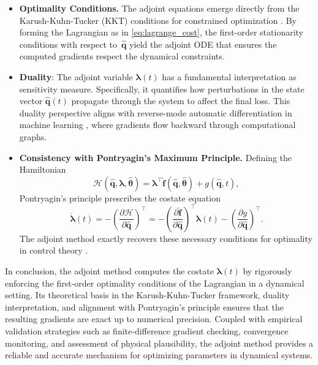 \begin{itemize}
    \item \textbf{Optimality Conditions.}  The adjoint equations emerge directly from the Karush-Kuhn-Tucker (KKT) conditions for constrained optimization \cite{nocedal1999numerical}. By forming the Lagrangian as in \eqref{eq:lagrange_cost},
  the first-order stationarity conditions with respect to~$\hat{\mathbf{q}}$ yield the adjoint ODE that ensures the computed gradients respect the dynamical constraints.
    
    \item \textbf{Duality}: The adjoint variable $\bm{\lambda}(t)$ has a fundamental interpretation as sensitivity measure. Specifically, it quantifies how perturbations in the state vector $\hat{\mathbf{q}}(t)$ propagate through the system to affect the final loss. This duality perspective aligns with reverse-mode automatic differentiation in machine learning \cite{chen2018neural}, where gradients flow backward through computational graphs.

    \item \textbf{Consistency with Pontryagin's Maximum Principle.}  Defining the Hamiltonian\\
  $$\mathcal{H}(\hat{\mathbf{q}}, \bm{\lambda}, \hat{\bm{\theta}}) 
      = \bm{\lambda}^\top \hat{\mathbf{f}}(\hat{\mathbf{q}}, \hat{\bm{\theta}}) 
      + g(\hat{\mathbf{q}}, t),$$
  Pontryagin's principle prescribes the costate equation\\
  $$\dot{\bm{\lambda}}(t) 
      = - \left(\frac{\partial \mathcal{H}}{\partial \hat{\mathbf{q}}} \right)^{\top}
      = - \left(\frac{\partial \hat{\mathbf{f}}}{\partial \hat{\mathbf{q}}} \right)^{\top}\bm{\lambda}(t) -  \left(\frac{\partial g}{\partial \hat{\mathbf{q}}} \right)^{\top}.$$
  The adjoint method exactly recovers these necessary conditions for optimality in control theory \cite{liberzon2011calculus}.
\end{itemize}

In conclusion, the adjoint method computes the costate $\bm{\lambda}(t)$ by rigorously enforcing the first-order optimality conditions of the Lagrangian in a dynamical setting. Its theoretical basis in the Karush-Kuhn-Tucker framework, duality interpretation, and alignment with Pontryagin's principle ensures that the resulting gradients are exact up to numerical precision. Coupled with empirical validation strategies such as finite-difference gradient checking, convergence monitoring, and assessment of physical plausibility, the adjoint method provides a reliable and accurate mechanism for optimizing parameters in dynamical systems.

